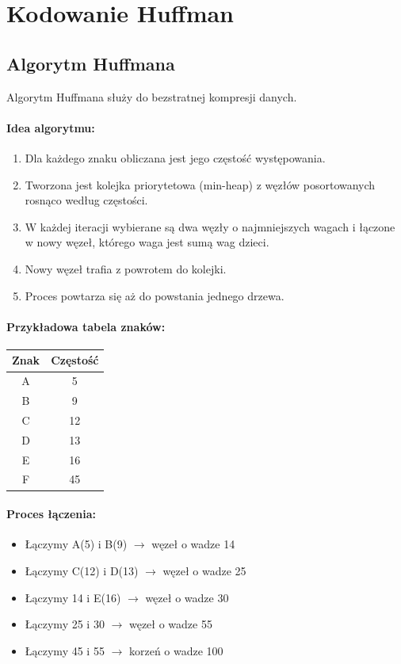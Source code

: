 \documentclass[12pt]{article}
\begin{document}
\section{Kodowanie Huffman}

\subsection{Algorytm Huffmana}

Algorytm Huffmana służy do bezstratnej kompresji danych.

\paragraph{Idea algorytmu:}
\begin{enumerate}
    \item Dla każdego znaku obliczana jest jego częstość występowania.
    \item Tworzona jest kolejka priorytetowa (min-heap) z węzłów posortowanych rosnąco według częstości.
    \item W każdej iteracji wybierane są dwa węzły o najmniejszych wagach i łączone w nowy węzeł, którego waga jest sumą wag dzieci.
    \item Nowy węzeł trafia z powrotem do kolejki.
    \item Proces powtarza się aż do powstania jednego drzewa.
\end{enumerate}

\paragraph{Przykładowa tabela znaków:}

\begin{center}
\begin{tabular}{|c|c|}
\hline
\textbf{Znak} & \textbf{Częstość} \\
\hline
A & 5 \\
B & 9 \\
C & 12 \\
D & 13 \\
E & 16 \\
F & 45 \\
\hline
\end{tabular}
\end{center}

\paragraph{Proces łączenia:}
\begin{itemize}
    \item Łączymy A(5) i B(9) $\rightarrow$ węzeł o wadze 14
    \item Łączymy C(12) i D(13) $\rightarrow$ węzeł o wadze 25
    \item Łączymy 14 i E(16) $\rightarrow$ węzeł o wadze 30
    \item Łączymy 25 i 30 $\rightarrow$ węzeł o wadze 55
    \item Łączymy 45 i 55 $\rightarrow$ korzeń o wadze 100
\end{itemize}
\end{document}
